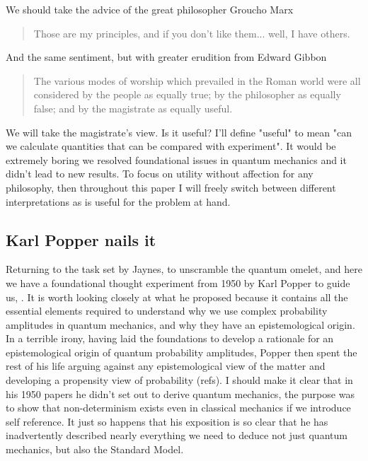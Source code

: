 We should take the advice of the great philosopher Groucho Marx~\autocite{marx_1933}
\begin{quotation}
  Those are my principles, and if you don't like them... well, I have others.
\end{quotation}
And the same sentiment, but with greater erudition from Edward Gibbon~\autocite{gibbon_1776}
\begin{quotation}
  The various modes of worship which prevailed in the Roman world were all considered by the people as equally true; by the philosopher as equally false; and by the magistrate as equally useful.
\end{quotation}
We will take the magistrate's view. Is it useful? I'll define "useful" to mean "can we calculate quantities that can be compared with experiment". It would be extremely boring we resolved foundational issues in quantum mechanics and it didn't lead to new results. To focus on utility without affection for any philosophy, then throughout this paper I will freely switch between different interpretations as is useful for the problem at hand.

\subsection{Karl Popper nails it}
\label{sec:popper}
Returning to the task set by Jaynes, to unscramble the quantum omelet, and here we have a foundational thought experiment from 1950 by Karl Popper to guide us, \autocite{Popper1950a, Popper1950b}. It is worth looking closely at what he proposed because it contains all the essential elements required to understand why we use complex probability amplitudes in quantum mechanics, and why they have an epistemological origin. In a terrible irony, having laid the foundations to develop a rationale for an epistemological origin of quantum probability amplitudes, Popper then spent the rest of his life arguing against any epistemological view of the matter and developing a propensity view of probability (refs). I should make it clear that in his 1950 papers he didn't set out to derive quantum mechanics, the purpose was to show that non-determinism exists even in classical mechanics if we introduce self reference. It just so happens that his exposition is so clear that he has inadvertently described nearly everything we need to deduce not just quantum mechanics, but also the Standard Model.

